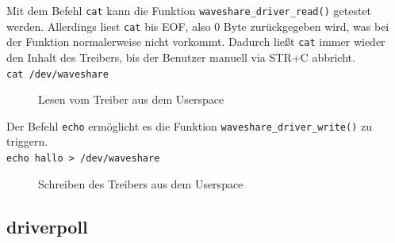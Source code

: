 Mit dem Befehl \texttt{cat} kann die Funktion \texttt{waveshare_driver_read()} getestet werden. Allerdings liest \texttt{cat} bis EOF, also 0 Byte zurückgegeben wird, was bei der Funktion normalerweise nicht vorkommt. Dadurch ließt \texttt{cat} immer wieder den Inhalt des Treibers, bis der Benutzer manuell via STR+C abbricht. \\

\texttt{cat /dev/waveshare} \\

\begin{figure}[H]
  \centering
  \caption{Lesen vom Treiber aus dem Userspace}
  \label{pic:cat_read}
\end{figure}

Der Befehl \texttt{echo} ermöglicht es die Funktion \texttt{waveshare_driver_write()} zu triggern. \\

\texttt{echo hallo > /dev/waveshare} \\

\begin{figure}[H]
  \centering
  \caption{Schreiben des Treibers aus dem Userspace}
  \label{pic:echo_write}
\end{figure}

\subsection{driverpoll} %

